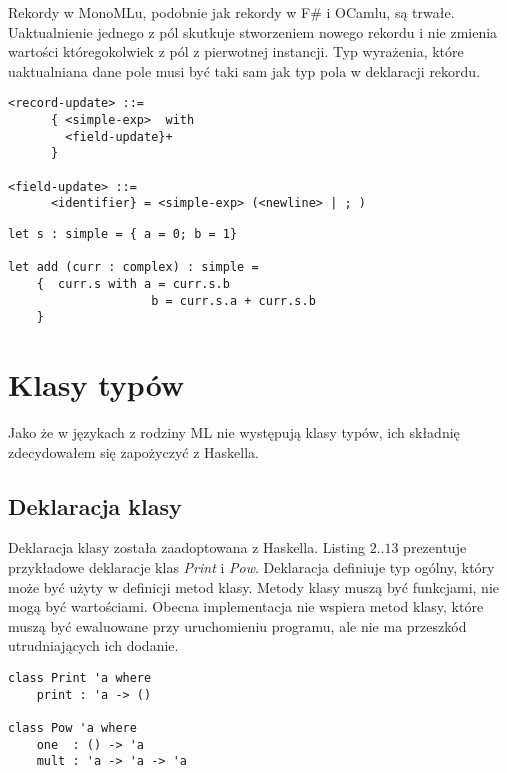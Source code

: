 \documentclass[declaration,shortabstract]{iithesis}
\begin{document}
Rekordy w MonoMLu, podobnie jak rekordy w F\# i OCamlu, 
są trwałe. 
Uaktualnienie jednego z pól skutkuje stworzeniem nowego rekordu i nie zmienia 
wartości któregokolwiek z pól z pierwotnej instancji. 
Typ wyrażenia, które uaktualniana dane pole musi być taki sam jak typ pola 
w deklaracji rekordu.

\begin{lstlisting}[frame=single, caption=Wyrażenia warunkowe.]
<record-update> ::=
      { <simple-exp>  with 
        <field-update}+ 
      }

<field-update> ::=
      <identifier} = <simple-exp> (<newline> | ; )
\end{lstlisting}

\begin{lstlisting}[frame=single, caption=Uaktualnianie rekordu.]
let s : simple = { a = 0; b = 1}

let add (curr : complex) : simple = 
    {  curr.s with a = curr.s.b
                    b = curr.s.a + curr.s.b 
    }
\end{lstlisting}

\section{Klasy typów}

Jako że w językach z rodziny ML nie występują klasy typów, ich składnię
zdecydowałem się zapożyczyć z Haskella.

\subsection{Deklaracja klasy}

Deklaracja klasy została zaadoptowana z Haskella. Listing $2..13$ prezentuje 
przykładowe deklaracje klas \textit{Print} i \textit{Pow}. Deklaracja 
definiuje typ ogólny, który może być użyty w definicji metod klasy.
Metody klasy muszą być funkcjami, nie mogą być wartościami. Obecna implementacja
nie wspiera metod klasy, które muszą być ewaluowane przy uruchomieniu programu, 
ale nie ma przeszkód utrudniających ich dodanie.

\begin{lstlisting}[frame=single, caption=Deklaracja klasy.]
class Print 'a where 
    print : 'a -> ()
  
class Pow 'a where 
    one  : () -> 'a
    mult : 'a -> 'a -> 'a
\end{lstlisting}
\end{document}
